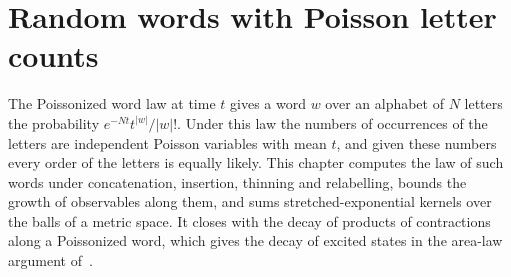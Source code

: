 \chapter{Random words with Poisson letter counts}
\label{ch:poisson_words}

The Poissonized word law at time $t$ gives a word $w$ over an alphabet of $N$
letters the probability $e^{-Nt}t^{|w|}/|w|!$. Under this law the numbers of
occurrences of the letters are independent Poisson variables with mean $t$, and
given these numbers every order of the letters is equally likely. This chapter
computes the law of such words under concatenation, insertion, thinning and
relabelling, bounds the growth of observables along them, and sums
stretched-exponential kernels over the balls of a metric space. It closes with
the decay of products of contractions along a Poissonized word, which gives the
decay of excited states in the area-law argument of~\cite{OpenAI2026AreaLaw}.































